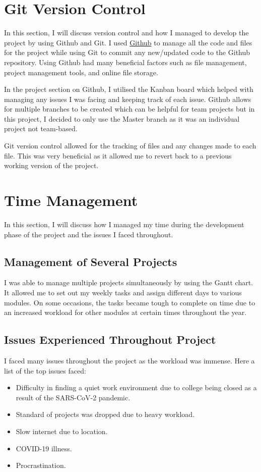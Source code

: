 \section{Git Version Control}
In this section, I will discuss version control and how I managed to develop the project by using Github and Git. I used \href{https://github.com/MarkReillyGMIT/AppliedProject}{Github} to manage all the code and files for the project while using Git to commit any new/updated code to the Github repository. Using Github had many beneficial factors such as file management, project management tools, and online file storage. 

In the project section on Github, I utilised the Kanban board which helped with managing any issues I was facing and keeping track of each issue. Github allows for multiple branches to be created which can be helpful for team projects but in this project, I decided to only use the Master branch as it was an individual project not team-based.

Git version control allowed for the tracking of files and any changes made to each file. This was very beneficial as it allowed me to revert back to a previous working version of the project. 

\section{Time Management}
In this section, I will discuss how I managed my time during the development phase of the project and the issues I faced throughout.

\subsection{Management of Several Projects}
I was able to manage multiple projects simultaneously by using the Gantt chart. It allowed me to set out my weekly tasks and assign different days to various modules. On some occasions, the tasks became tough to complete on time due to an increased workload for other modules at certain times throughout the year. 

\subsection{Issues Experienced Throughout Project}
I faced many issues throughout the project as the workload was immense. Here a list of the top issues faced:

\begin{itemize}
    \item Difficulty in finding a quiet work environment due to college being closed as a result of the SARS-CoV-2 pandemic.
    \item Standard of projects was dropped due to heavy workload.
    \item Slow internet due to location.
    \item COVID-19 illness.
    \item Procrastination. 
\end{itemize}
\newpage


